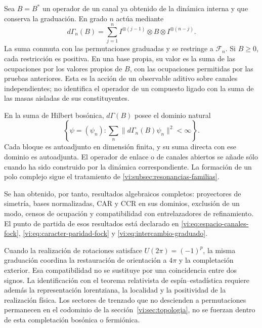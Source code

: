 Sea \(B=B^*\) un operador de un canal ya obtenido de la
dinámica interna y que conserva la graduación. En grado \(n\)
actúa mediante
\[
 d\Gamma_n(B)=\sum_{j=1}^n
 I^{\otimes(j-1)}\otimes B\otimes I^{\otimes(n-j)}.
\]
La suma conmuta con las permutaciones graduadas y se restringe
a \(\mathcal F_n\). Si \(B\ge0\), cada restricción es positiva.
En una base propia, su valor es la suma de las ocupaciones
por los valores propios de \(B\), con las ocupaciones
permitidas por las pruebas anteriores. Esta es la acción
de un observable aditivo sobre canales independientes;
no identifica el operador de un compuesto ligado con la
suma de las masas aisladas de sus constituyentes.

En la suma de Hilbert bosónica, \(d\Gamma(B)\) posee el
dominio natural
\[
 \left\{\psi=(\psi_n):
 \sum_n\|d\Gamma_n(B)\psi_n\|^2<\infty\right\}.
\]
Cada bloque es autoadjunto en dimensión finita, y su suma
directa con ese dominio es autoadjunta. El operador de enlace
o de canales abiertos se añade sólo cuando ha sido construido
por la dinámica correspondiente. La formación de un polo
complejo sigue el tratamiento de
\ref{vi:subsec:resonancias-familias}.

Se han obtenido, por tanto, resultados algebraicos completos:
proyectores de simetría, bases normalizadas, CAR y CCR en
sus dominios, exclusión de un modo, censos de ocupación y
compatibilidad con entrelazadores de refinamiento. El punto
de partida de esos resultados está declarado en
\eqref{vi:eq:espacio-canales-fock},
\eqref{vi:eq:caracter-paridad-fock} y
\eqref{vi:eq:intercambio-graduado}.

Cuando la realización de rotaciones satisface
\(U(2\pi)=(-1)^p\), la misma graduación coordina la
restauración de orientación a \(4\pi\) y la completación
exterior. Esa compatibilidad no se sustituye por una
coincidencia entre dos signos. La identificación con el
teorema relativista de espín--estadística requiere además
la representación lorentziana, la localidad y la positividad
de la realización física. Los sectores de trenzado que no
descienden a permutaciones permanecen en el codominio de
la sección~\ref{vi:sec:topologia}, no se fuerzan dentro
de esta completación bosónica o fermiónica.
